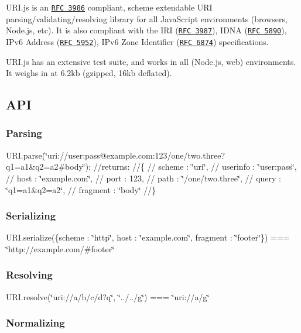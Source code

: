U\+R\+I.\+js is an \href{http://www.ietf.org/rfc/rfc3986.txt}{\tt R\+FC 3986} compliant, scheme extendable U\+RI parsing/validating/resolving library for all Java\+Script environments (browsers, Node.\+js, etc). It is also compliant with the I\+RI (\href{http://www.ietf.org/rfc/rfc3987.txt}{\tt R\+FC 3987}), I\+D\+NA (\href{http://www.ietf.org/rfc/rfc5890.txt}{\tt R\+FC 5890}), I\+Pv6 Address (\href{http://www.ietf.org/rfc/rfc5952.txt}{\tt R\+FC 5952}), I\+Pv6 Zone Identifier (\href{http://www.ietf.org/rfc/rfc6874.txt}{\tt R\+FC 6874}) specifications.

U\+R\+I.\+js has an extensive test suite, and works in all (Node.\+js, web) environments. It weighs in at 6.\+2kb (gzipped, 16kb deflated).

\subsection*{A\+PI}

\subsubsection*{Parsing}

U\+R\+I.\+parse(\char`\"{}uri\+://user\+:pass@example.\+com\+:123/one/two.\+three?q1=a1\&q2=a2\#body\char`\"{}); //returns\+: //\{ // scheme \+: \char`\"{}uri\char`\"{}, // userinfo \+: \char`\"{}user\+:pass\char`\"{}, // host \+: \char`\"{}example.\+com\char`\"{}, // port \+: 123, // path \+: \char`\"{}/one/two.\+three\char`\"{}, // query \+: \char`\"{}q1=a1\&q2=a2\char`\"{}, // fragment \+: \char`\"{}body\char`\"{} //\}

\subsubsection*{Serializing}

U\+R\+I.\+serialize(\{scheme \+: \char`\"{}http\char`\"{}, host \+: \char`\"{}example.\+com\char`\"{}, fragment \+: \char`\"{}footer\char`\"{}\}) === \char`\"{}http\+://example.\+com/\#footer\char`\"{}

\subsubsection*{Resolving}

U\+R\+I.\+resolve(\char`\"{}uri\+://a/b/c/d?q\char`\"{}, \char`\"{}../../g\char`\"{}) === \char`\"{}uri\+://a/g\char`\"{}

\subsubsection*{Normalizing}

